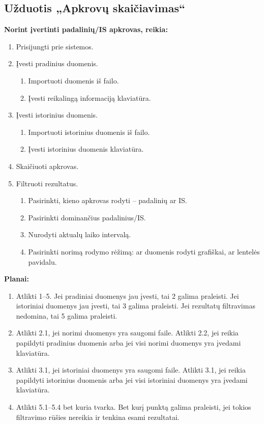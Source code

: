 \subsection{Užduotis „Apkrovų skaičiavimas“}

\textbf{Norint įvertinti padalinių/IS apkrovas, reikia:}
\begin{enumerate}
  \item Prisijungti prie sistemos.
  
  \item Įvesti pradinius duomenis.
  \begin{enumerate}
    \item Importuoti duomenis iš failo.
    \item Įvesti reikalingą informaciją klaviatūra.
  \end{enumerate}
  
  \item Įvesti istorinius duomenis.
  \begin{enumerate}
    \item Importuoti istorinius duomenis iš failo.
    \item Įvesti istorinius duomenis klaviatūra.
  \end{enumerate}
  
  \item Skaičiuoti apkrovas.
  \item Filtruoti rezultatus.
  \begin{enumerate}
    \item Pasirinkti, kieno apkrovas rodyti – padalinių ar IS.
    \item Pasirinkti dominančius padalinius/IS.
    \item Nurodyti aktualų laiko intervalą.
    \item Pasirinkti norimą rodymo rėžimą: ar duomenis rodyti grafiškai, ar lentelės pavidalu.
  \end{enumerate}
\end{enumerate}

\vspace{1cm}
\textbf{Planai:}
\begin{enumerate}
  \item Atlikti 1–5. Jei pradiniai duomenys jau įvesti, tai 2 galima praleisti.
  Jei istoriniai duomenys jau įvesti, tai 3 galima praleisti.
  Jei rezultatų filtravimas nedomina, tai 5 galima praleisti.
  
  \item Atlikti 2.1, jei norimi duomenys yra saugomi faile. Atlikti 2.2, jei reikia papildyti
  pradinius duomenis arba jei visi norimi duomenys yra įvedami klaviatūra.
  
  \item Atlikti 3.1, jei istoriniai duomenys yra saugomi faile. Atlikti 3.1, jei reikia papildyti
  istorinius duomenis arba jei visi istoriniai duomenys yra įvedami klaviatūra.
  
  \item Atlikti 5.1–5.4 bet kuria tvarka. Bet kurį punktą galima praleisti, jei tokios filtravimo
  rūšies nereikia ir tenkina esami rezultatai.
\end{enumerate}

